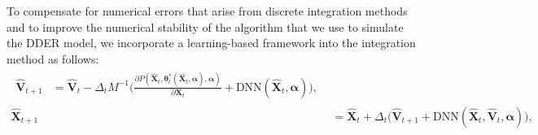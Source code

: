 To compensate for numerical errors that arise from discrete integration methods and to improve the numerical stability of the algorithm that we use to simulate the DDER model, we incorporate a learning-based framework into the integration method as follows: 
\begin{align}
    \begin{split}
        \hat{\textbf{V}}_{t+1} &= \hat{\textbf{V}}_t-\Delta_tM^{-1}\Big(\frac{\partial P(\hat{\textbf{X}}_t, \bm{\theta}^*_t(\hat{\textbf{X}}_t, \bm{\alpha}),\bm{\alpha})}{\partial \textbf{X}_{t}} + \text{DNN}(\hat{\textbf{X}}_t, \bm{\alpha})\Big), \label{eq:NN-Semi-Euler1}
        \end{split} \\  
                \hat{\textbf{X}}_{t+1} &= \hat{\textbf{X}}_t + \Delta_t \Big(\hat{\textbf{V}}_{t+1} + \text{DNN}(\hat{\textbf{X}}_t, \hat{\textbf{V}}_t, \bm{\alpha})\Big),
       \label{eq:NN-Semi-Euler3}
\end{align}
